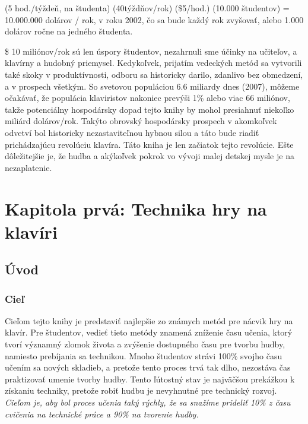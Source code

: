 (5 hod./týždeň, na študenta) (40týždňov/rok) (\$5/hod.) (10.000 študentov) = 10.000.000 dolárov / rok, v roku 2002, čo sa bude každý rok zvyšovať, alebo 1.000 dolárov ročne na jedného študenta.

\$ 10 miliónov/rok sú len úspory študentov, nezahrnuli sme účinky na učiteľov, a klavírny a hudobný priemysel. Kedykoľvek, prijatím vedeckých metód sa vytvorili také skoky v produktívnosti, odboru sa historicky darilo, zdanlivo bez obmedzení, a v prospech všetkým. So svetovou populáciou 6.6 miliardy dnes (2007), môžeme očakávať, že populácia klaviristov nakoniec prevýši 1\% alebo viac 66 miliónov, takže potenciálny hospodársky dopad tejto knihy by mohol presiahnuť niekoľko miliárd dolárov/rok. Takýto obrovský hospodársky prospech v akomkoľvek odvetví bol historicky nezastaviteľnou hybnou silou a táto bude riadiť prichádzajúcu revolúciu klavíra. Táto kniha je len začiatok tejto revolúcie. Ešte dôležitejšie je, že hudba a akýkoľvek pokrok vo vývoji malej detskej mysle je na nezaplatenie.

\clearpage{\pagestyle{empty}\cleardoublepage}

\pagestyle{fancy}

\fancyhf{}
\fancyfoot[LE,RO]{\thepage}
\renewcommand{\headrulewidth}{0pt}
\renewcommand{\footrulewidth}{0pt}

\chapter*{Kapitola prvá: Technika hry na klavíri}
\section{Úvod}
\subsection{Cieľ}
Cieľom tejto knihy je predstaviť najlepšie zo známych metód pre nácvik hry na klavír. Pre študentov, vedieť tieto metódy znamená zníženie času učenia, ktorý tvorí významný zlomok života a zvýšenie dostupného času pre tvorbu hudby, namiesto prebíjania sa technikou. Mnoho študentov strávi 100\% svojho času učením sa nových skladieb, a pretože tento proces trvá tak dlho, nezostáva čas praktizovať umenie tvorby hudby. Tento ľútostný stav je najväčšou prekážkou k získaniu techniky, pretože robiť hudbu je nevyhnutné pre technický rozvoj. \emph{Cieľom je, aby bol proces učenia taký rýchly, že sa snažíme prideliť 10\% z času cvičenia na technické práce a 90\% na tvorenie hudby.}

